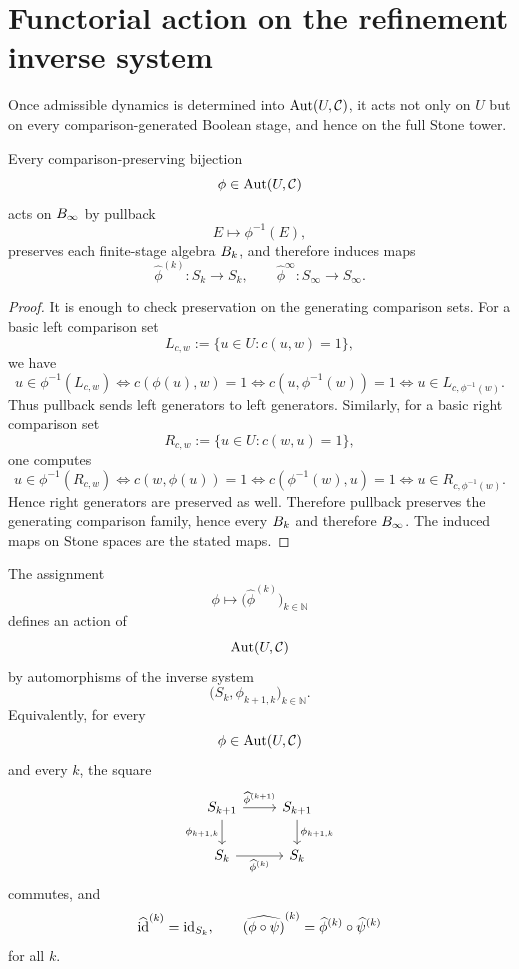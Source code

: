 \section{Functorial action on the refinement inverse system}
Once admissible dynamics is determined into \(\operatorname{Aut}(U,\mathcal C)\), it acts
not only on \(U\) but on every comparison-generated Boolean stage, and
hence on the full Stone tower.
\begin{proposition}
	\label{prop:boolean-inv}
	Every comparison-preserving bijection
	\[
		\phi\in\operatorname{Aut}(U,\mathcal C)
	\]
	acts on \(B_\infty\) by pullback
	\[
		E\longmapsto \phi^{-1}(E),
	\]
	preserves each finite-stage algebra \(B_k\), and therefore induces
	maps
	\[
		\widehat\phi^{(k)}\colon S_k\to S_k,
		\qquad
		\widehat\phi^\infty\colon S_\infty\to S_\infty.
	\]
\end{proposition}
\begin{proof}
	It is enough to check preservation on the generating comparison sets.
	For a basic left comparison set
	\[
		L_{c,w}:=\{u\in U:c(u,w)=1\},
	\]
	we have
	\[
		u\in\phi^{-1}(L_{c,w})
		\iff
		c(\phi(u),w)=1
		\iff
		c(u,\phi^{-1}(w))=1
		\iff
		u\in L_{c,\phi^{-1}(w)}.
	\]
	Thus pullback sends left generators to left generators.
	Similarly, for a basic right comparison set
	\[
		R_{c,w}:=\{u\in U:c(w,u)=1\},
	\]
	one computes
	\[
		u\in\phi^{-1}(R_{c,w})
		\iff
		c(w,\phi(u))=1
		\iff
		c(\phi^{-1}(w),u)=1
		\iff
		u\in R_{c,\phi^{-1}(w)}.
	\]
	Hence right generators are preserved as well.
	Therefore pullback preserves the generating comparison family, hence
	every \(B_k\) and therefore \(B_\infty\).  The induced maps on Stone
	spaces are the stated maps.
\end{proof}
\begin{theorem}
	\label{thm:Aut-functorial}
	The assignment
	\[
		\phi\longmapsto\bigl(\widehat\phi^{(k)}\bigr)_{k\in\mathbb N}
	\]
	defines an action of
	\[
		\operatorname{Aut}(U,\mathcal C)
	\]
	by automorphisms of the inverse system
	\[
		\bigl(S_k,\phi_{k+1,k}\bigr)_{k\in\mathbb N}.
	\]
	Equivalently, for every
	\[
		\phi\in\operatorname{Aut}(U,\mathcal C)
	\]
	and every \(k\), the square
	\[
		\begin{tikzcd}
			S_{k+1} \arrow[r,"\widehat\phi^{(k+1)}"] \arrow[d,"\phi_{k+1,k}"']
			& S_{k+1} \arrow[d,"\phi_{k+1,k}"] \\
			S_k \arrow[r,"\widehat\phi^{(k)}"']
			& S_k
		\end{tikzcd}
	\]
	commutes, and
	\[
		\widehat{\operatorname{id}}^{(k)}=\operatorname{id}_{S_k},
		\qquad
		\widehat{(\phi\circ\psi)}^{(k)}
		=
		\widehat\phi^{(k)}\circ\widehat\psi^{(k)}
	\]
	for all \(k\).
\end{theorem}
